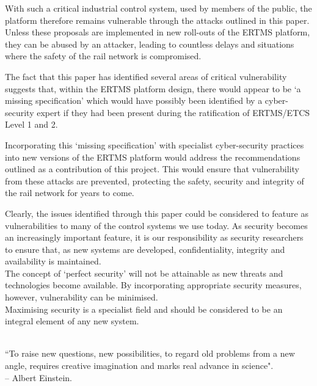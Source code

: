\documentclass[twoside,11pt,a4paper]{article}
\begin{document}
With such a critical industrial control system, used by members of the public, the platform therefore remains vulnerable through the attacks outlined in this paper. Unless these proposals are implemented in new roll-outs of the ERTMS platform, they can be abused by an attacker, leading to countless delays and situations where the safety of the rail network is compromised.

The fact that this paper has identified several areas of critical vulnerability suggests that, within the ERTMS platform design, there would appear to be `a missing specification' which would have possibly been identified by a cyber-security expert if they had been present during the ratification of ERTMS/ETCS Level 1 and 2.

Incorporating this `missing specification' with specialist cyber-security practices into new versions of the ERTMS platform would address the recommendations outlined as a contribution of this project. This would ensure that vulnerability from these attacks are prevented, protecting the safety, security and integrity of the rail network for years to come.

Clearly, the issues identified through this paper could be considered to feature as vulnerabilities to many of the control systems we use today. As security becomes an increasingly important feature, it is our responsibility as security researchers to ensure that, as new systems are developed, confidentiality, integrity and availability is maintained.\\The concept of `perfect security' will not be attainable as new threats and technologies become available. By incorporating appropriate security measures, however, vulnerability can be minimised.\\Maximising security is a specialist field and should be considered to be an integral element of any new system.\\\\

\begin{center}
``To raise new questions, new possibilities, to regard old problems from a new angle, requires creative imagination and marks real advance in science".\\
-- Albert Einstein.
\end{center}

\clearpage
\lhead{}\rhead{}
{}
 

\end{document}
